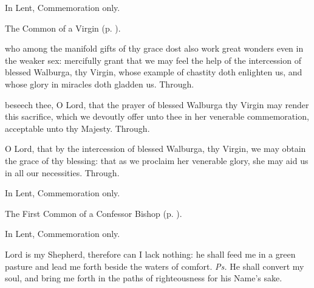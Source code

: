 \clearpage
{}

\begin{rubric}
	In Lent, Commemoration only.
\end{rubric}

\begin{rubric}
	The Common of a Virgin (p. \pageref{CommonVirginOnlyI}).
\end{rubric}

\collect
{} who among the manifold gifts of thy grace dost also work great wonders even in the weaker sex: mercifully grant that we may feel the help of the intercession of blessed Walburga, thy Virgin, whose example of chastity doth enlighten us, and whose glory in miracles doth gladden us. Through.

\secret
{} beseech thee, O Lord, that the prayer of blessed Walburga thy Virgin may render this sacrifice, which we devoutly offer unto thee in her venerable commemoration, acceptable unto thy Majesty. Through.

\postcommunion
{} O Lord, that by the intercession of blessed Walburga, thy Virgin, we may obtain the grace of thy blessing: that as we proclaim her venerable glory, she may aid us in all our necessities. Through.



\begin{rubric}
	In Lent, Commemoration only.
\end{rubric}

\begin{rubric}
	The First Common of a Confessor Bishop (p. \pageref{CommonConfessorBishopI}).
\end{rubric}


\clearpage
{}\label{RaphaelBrooklyn}

\begin{rubric}
	In Lent, Commemoration only.
\end{rubric}

\introit
{} Lord is my Shepherd, therefore can I lack nothing: he shall feed me in a green pasture and lead me forth beside the waters of comfort. \textit{Ps.} He shall convert my soul, and bring me forth in the paths of righteousness for his Name's sake.

